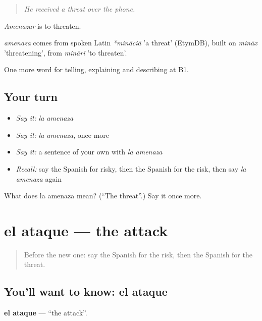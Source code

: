 \begin{quote}
\emph{He received a threat over the phone.}
\end{quote}

\emph{Amenazar} is to threaten.

\begin{cousinweb}
\emph{amenaza} comes from spoken Latin \emph{*mināciā} 'a threat' (EtymDB), built on \emph{mināx} 'threatening', from \emph{minārī} 'to threaten'.
\end{cousinweb}

\begin{grammarlens}[title={What you've built}]
One more word for telling, explaining and describing at B1.
\end{grammarlens}

\subsection*{Your turn}
\begin{itemize}
\raggedright
  \item \emph{Say it:} \emph{la amenaza}
  \item \emph{Say it:} \emph{la amenaza}, once more
  \item \emph{Say it:} a sentence of your own with \emph{la amenaza}
  \item \emph{Recall:} say the Spanish for risky, then the Spanish for the risk, then say \emph{la amenaza} again
\end{itemize}

\begin{tcolorbox}[breakable,colback=teal!4,colframe=teal!35!black,title={Before you move on}]
What does la amenaza mean? (\textquotedblleft{}The threat\textquotedblright{}.) Say it once more.
\end{tcolorbox}
\section[el ataque]{el ataque — the attack}

\label{lesson:ES-C530-ataque}



\begin{quote}
Before the new one: say the Spanish for the risk, then the Spanish for the threat.
\end{quote}

\subsection*{You'll want to know: el ataque}
\textbf{el ataque} — \textquotedblleft{}the attack\textquotedblright{}.

